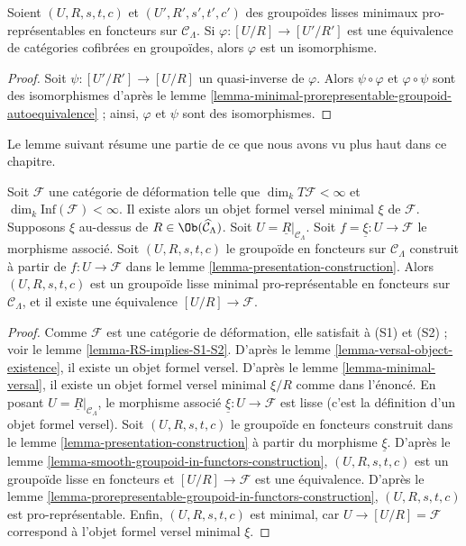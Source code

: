 \begin{lemma}
\label{lemma-minimal-prorepresentable-groupoid-equivalence}
Soient $(U, R, s, t, c)$ et $(U', R', s', t', c')$ des groupoïdes lisses
minimaux pro-représentables en foncteurs sur $\mathcal{C}_\Lambda$. Si
$\varphi : [U/R] \to [U'/R']$ est une équivalence de catégories cofibrées en
groupoïdes, alors $\varphi$ est un isomorphisme.
\end{lemma}

\begin{proof}
Soit $\psi : [U'/R'] \to [U/R]$ un quasi-inverse de $\varphi$. Alors
$\psi \circ \varphi$ et $\varphi \circ \psi$ sont des isomorphismes d'après
le lemme \ref{lemma-minimal-prorepresentable-groupoid-autoequivalence} ; ainsi,
$\varphi$ et $\psi$ sont des isomorphismes.
\end{proof}

\noindent
Le lemme suivant résume une partie de ce que nous avons vu plus haut dans ce
chapitre.

\begin{lemma}
\label{lemma-minimal-groupoid-in-functors-construction}
Soit $\mathcal{F}$ une catégorie de déformation telle que
$\dim_k T\mathcal{F} <\infty$ et
$\dim_k \text{Inf}(\mathcal{F}) < \infty$. Il existe alors un objet formel
versel minimal $\xi$ de $\mathcal{F}$. Supposons $\xi$ au-dessus de
$R \in \Ob(\widehat{\mathcal{C}}_\Lambda)$. Soit
$U = \underline{R}|_{\mathcal{C}_\Lambda}$. Soit
$f = \underline{\xi} : U \to \mathcal{F}$ le morphisme associé. Soit
$(U, R, s, t, c)$ le groupoïde en foncteurs sur $\mathcal{C}_\Lambda$
construit à partir de $f : U \to \mathcal{F}$ dans le lemme
\ref{lemma-presentation-construction}. Alors $(U, R, s, t, c)$ est un
groupoïde lisse minimal pro-représentable en foncteurs sur
$\mathcal{C}_\Lambda$, et il existe une équivalence
$[U/R] \to \mathcal{F}$.
\end{lemma}

\begin{proof}
Comme $\mathcal{F}$ est une catégorie de déformation, elle satisfait à (S1)
et (S2) ; voir le lemme \ref{lemma-RS-implies-S1-S2}. D'après le lemme
\ref{lemma-versal-object-existence}, il existe un objet formel versel. D'après
le lemme \ref{lemma-minimal-versal}, il existe un objet formel versel minimal
$\xi/R$ comme dans l'énoncé. En posant
$U = \underline{R}|_{\mathcal{C}_\Lambda}$, le morphisme associé
$\underline{\xi} : U \to \mathcal{F}$ est lisse (c'est la définition d'un
objet formel versel). Soit $(U, R, s, t, c)$ le groupoïde en foncteurs construit
dans le lemme \ref{lemma-presentation-construction} à partir du morphisme
$\underline{\xi}$. D'après le lemme
\ref{lemma-smooth-groupoid-in-functors-construction},
$(U, R, s, t, c)$ est un groupoïde lisse en foncteurs et
$[U/R] \to \mathcal{F}$ est une équivalence. D'après le lemme
\ref{lemma-prorepresentable-groupoid-in-functors-construction},
$(U, R, s, t, c)$ est pro-représentable. Enfin, $(U, R, s, t, c)$ est minimal,
car $U \to [U/R] = \mathcal{F}$ correspond à l'objet formel versel minimal
$\xi$.
\end{proof}

